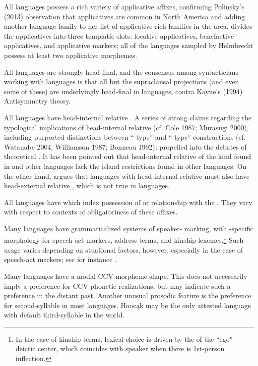 \begin{refsection}
All  languages possess a rich variety of applicative affixes, confirming Polinsky's (2013) observation that applicatives are common in North America and adding another language family to her list of applicative-rich families in the area. \citet{Helmbrecht2006} divides the applicatives into three templatic slots: locative applicatives, benefactive applicatives, and applicative markers; all of the  languages sampled by Helmbrecht possess at least two applicative morphemes.


All  languages are strongly head-final, and the consensus among syntacticians working with  languages is that all but the supraclausal projections (and even some of these) are underlyingly head-final in  languages, contra Kayne's (1994) Antisymmetry theory.


All  languages have head-internal relative . A series of strong claims regarding the typological implications of head-internal relative  (cf. Cole 1987; Murasugi 2000), including purported distinctions between ``-type'' and ``-type'' constructions (cf. Watanabe 2004; Williamson 1987; Bonneau 1992), propelled  into the debates of theoretical . It has been pointed out that head-internal relative  of the kind found in  and other  languages lack the island restrictions found in other languages. On the other hand, \citet{Murasugi2000} argues that languages with head-internal relative  must also have head-external relative , which is not true in  languages.


All  languages have  which index  possession of or relationship with the . They vary with respect to contexts of obligatoriness of these affixes.


Many  languages have grammaticalized systems of speaker- marking, with -specific morphology for speech-act markers, address terms, and kinship lexemes.\footnote{In the case of kinship terms, lexical choice is driven by the  of the ``ego" deictic center, which coincides with speaker  when there is 1st-person inflection.} Such usage varies depending on stuational factors, however, especially in the case of speech-act markers; see for instance \citet{Trechter1995}.   


Many  languages have a modal CCV morpheme shape. This does not necessarily imply a preference for CCV phonetic realizations, but may indicate such a preference in the distant past. Another unusual prosodic feature is the preference for second-syllable  in most  languages. Hooc\k{a}k may be the only attested language with default third-syllable  in the world.



\end{refsection}
